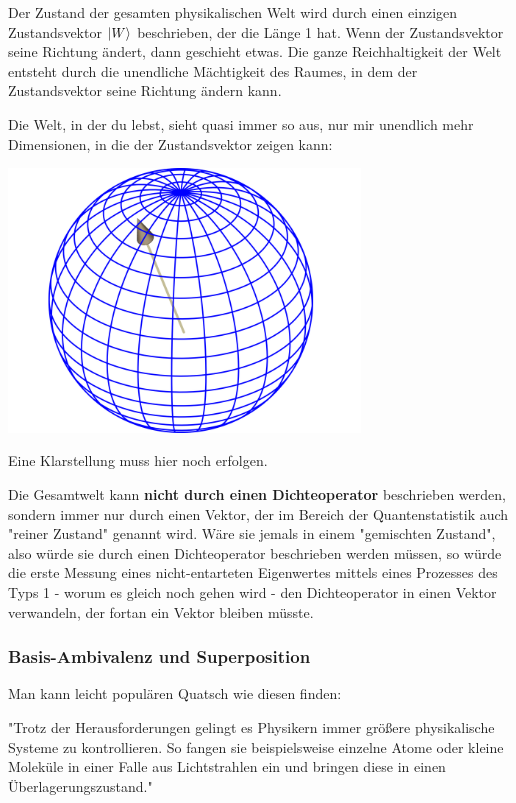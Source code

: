\documentclass[12pt]{book}
\begin{document}
Der Zustand der gesamten physikalischen Welt wird durch einen einzigen Zustandsvektor $\ket{W}$ beschrieben, der die Länge 1 hat. Wenn der Zustandsvektor seine Richtung ändert, dann geschieht etwas. Die ganze Reichhaltigkeit der Welt entsteht durch die unendliche Mächtigkeit des Raumes, in dem der Zustandsvektor seine Richtung ändern kann. 

Die Welt, in der du lebst, sieht quasi immer so aus, nur mir unendlich mehr Dimensionen, in die der Zustandsvektor zeigen kann:
\begin{center}
\includegraphics[width=0.7\textwidth]{Bilder/Weltzustand.png}
\end{center}

Eine Klarstellung muss hier noch erfolgen.

Die Gesamtwelt kann \textbf{nicht durch einen Dichteoperator} beschrieben werden, sondern immer nur durch einen Vektor, der im Bereich der Quantenstatistik auch "reiner Zustand" genannt wird. Wäre sie  jemals in einem "gemischten Zustand", also würde sie durch einen Dichteoperator beschrieben werden müssen, so würde die erste Messung eines nicht-entarteten Eigenwertes mittels eines Prozesses des Typs 1 - worum es gleich noch gehen wird - den Dichteoperator in einen Vektor verwandeln, der fortan ein Vektor bleiben müsste.

\subsubsection{Basis-Ambivalenz und Superposition}

Man kann leicht populären Quatsch wie diesen finden:

"Trotz der Herausforderungen gelingt es Physikern immer größere physikalische Systeme zu kontrollieren. So fangen sie beispielsweise einzelne Atome oder kleine Moleküle in einer Falle aus Lichtstrahlen ein und bringen diese in einen Überlagerungszustand."
\end{document}
